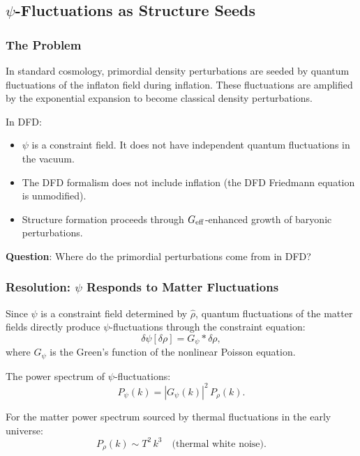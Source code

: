\documentclass[11pt,a4paper]{article}
\begin{document}
\subsection{$\psi$-Fluctuations as Structure Seeds}
\label{sec:structure-seeds}

\subsubsection{The Problem}

In standard cosmology, primordial density perturbations are seeded by quantum fluctuations of the inflaton field during inflation. These fluctuations are amplified by the exponential expansion to become classical density perturbations.

In DFD:
\begin{itemize}
\item $\psi$ is a constraint field. It does not have independent quantum fluctuations in the vacuum.
\item The DFD formalism does not include inflation (the DFD Friedmann equation is unmodified).
\item Structure formation proceeds through $G_{\rm eff}$-enhanced growth of baryonic perturbations.
\end{itemize}

\textbf{Question}: Where do the primordial perturbations come from in DFD?

\subsubsection{Resolution: $\psi$ Responds to Matter Fluctuations}

Since $\psi$ is a constraint field determined by $\hat\rho$, quantum fluctuations of the matter fields directly produce $\psi$-fluctuations through the constraint equation:
\begin{equation}
\delta\psi[\delta\rho] = G_\psi \ast \delta\rho,
\end{equation}
where $G_\psi$ is the Green's function of the nonlinear Poisson equation.

The power spectrum of $\psi$-fluctuations:
\begin{equation}
P_\psi(k) = |G_\psi(k)|^2\,P_\rho(k).
\end{equation}

For the matter power spectrum sourced by thermal fluctuations in the early universe:
\begin{equation}
P_\rho(k) \sim T^2\,k^3\quad\text{(thermal white noise)}.
\end{equation}
\end{document}
